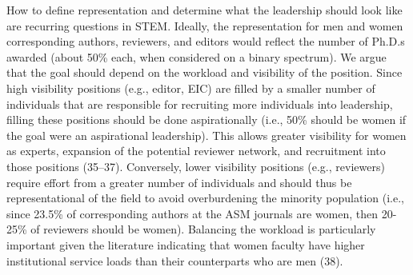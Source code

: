 \documentclass[11pt,]{article}
\begin{document}
How to define representation and determine what the leadership should
look like are recurring questions in STEM. Ideally, the representation
for men and women corresponding authors, reviewers, and editors would
reflect the number of Ph.D.s awarded (about 50\% each, when considered
on a binary spectrum). We argue that the goal should depend on the
workload and visibility of the position. Since high visibility positions
(e.g., editor, EIC) are filled by a smaller number of individuals that
are responsible for recruiting more individuals into leadership, filling
these positions should be done aspirationally (i.e., 50\% should be
women if the goal were an aspirational leadership). This allows greater
visibility for women as experts, expansion of the potential reviewer
network, and recruitment into those positions (35--37). Conversely,
lower visibility positions (e.g., reviewers) require effort from a
greater number of individuals and should thus be representational of the
field to avoid overburdening the minority population (i.e., since 23.5\%
of corresponding authors at the ASM journals are women, then 20-25\% of
reviewers should be women). Balancing the workload is particularly
important given the literature indicating that women faculty have higher
institutional service loads than their counterparts who are men (38).
\end{document}
